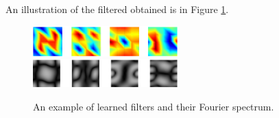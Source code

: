\documentclass[a4paper]{article}
\begin{document}
%	


An illustration of the filtered obtained is in Figure \ref{fig:1}.
\begin{figure}[h!]
    \centering
    \includegraphics[width=0.5\textwidth]{fig11.eps}
  \includegraphics[width=0.5\textwidth]{fig12.eps}
    \caption{An example of learned filters and their Fourier spectrum.}
    \label{fig:1}
\end{figure}
\end{document}

